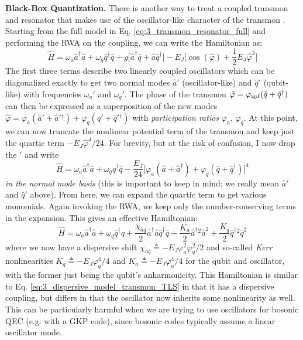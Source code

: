 \noindent\textbf{Black-Box Quantization.} There is another way to treat a coupled transmon and resonator that makes use of the oscillator-like character of the transmon \cite{nigg2012black}. Starting from the full model in Eq. \eqref{eq:3_transmon_resonator_full} and performing the RWA on the coupling, we can write the Hamiltonian as:
\begin{equation}
    \hat{H} = \omega_a \hat{a}^\dagger\hat{a} + \omega_q \hat{q}^\dagger\hat{q} + g\big[\hat{a}^\dagger\hat{q} + \hat{a}\hat{q}^\dagger\big] - E_J\bigg[\cos(\hat{\varphi}) + \frac{1}{2}E_J \hat{\varphi}^2\bigg]
\end{equation}
The first three terms describe two linearly coupled oscillators which can be diagonalized exactly to get two normal modes $\hat{a}'$ (oscillator-like) and $\hat{q}'$ (qubit-like) with frequencies $\omega_a'$ and $\omega_q'$. The phase of the transmon $\hat{\varphi} = \varphi_{\rm zpf}(\hat{q} + \hat{q}^\dagger)$ can then be expressed as a superposition of the new modes $\hat{\varphi} = \varphi_a(\hat{a}' + \hat{a}'{}^\dagger) + \varphi_q(\hat{q}' + \hat{q}'{}^\dagger)$ with \textit{participation ratios} $\varphi_a$, $\varphi_q$. At this point, we can now truncate the nonlinear potential term of the transmon and keep just the quartic term $-E_J\hat{\varphi}^4/24$. For brevity, but at the risk of confusion, I now drop the $'$ and write
\begin{equation}
    \hat{H} = \omega_a \hat{a}^\dagger\hat{a} + \omega_q \hat{q}^\dagger\hat{q} - \frac{E_J}{24}\big[\varphi_{a}(\hat{a} + \hat{a}^\dagger) + \varphi_{q}(\hat{q} + \hat{q}^\dagger)\big]^4
\end{equation}
\textit{in the normal mode basis} (this is important to keep in mind; we really mean $\hat{a}'$ and $\hat{q}'$ above). From here, we can expand the quartic term to get various monomials. Again invoking the RWA, we keep only the number-conserving terms in the expansion. This gives an effective Hamiltonian:
\begin{equation}
    \hat{H} = \omega_a \hat{a}^\dagger\hat{a} + \omega_q \hat{q}^\dagger\hat{q} + \frac{\chi_{aq}}{2}\hat{a}^\dagger\hat{a}\hat{q}^\dagger\hat{q}  + \frac{K_a}{2}\hat{a}^\dagger{}^2\hat{a}^2 + \frac{K_q}{2}\hat{q}^\dagger{}^2\hat{q}^2
\end{equation}
where we now have a dispersive shift $\chi_{aq} \triangleq -E_J\varphi_a^2 \varphi_q^2/2$ and so-called \textit{Kerr} nonlinearities $K_q \triangleq -E_J\varphi_q^4/4$ and $K_a \triangleq -E_J\varphi_a^4/4$ for the qubit and oscillator, with the former just being the qubit's anharmonicity. This Hamiltonian is similar to Eq. \ref{eq:3_dispersive_model_transmon_TLS} in that it has a dispersive coupling, but differs in that the oscillator now inherits some nonlinearity as well. This can be particularly harmful when we are trying to use oscillators for bosonic QEC (e.g. with a GKP code), since bosonic codes typically assume a linear oscillator mode. 


